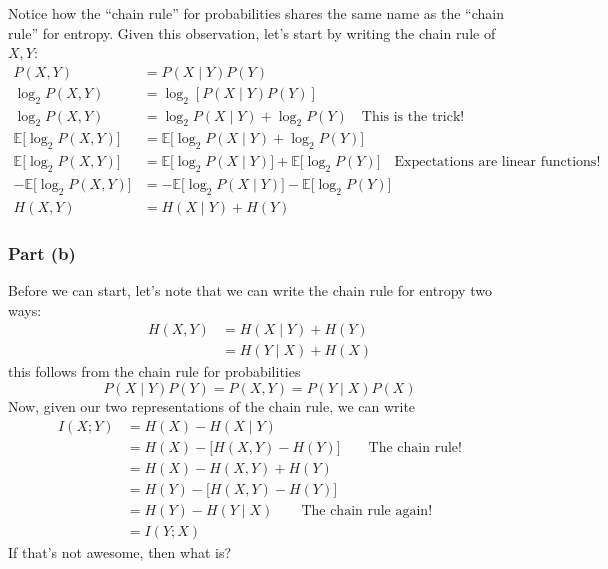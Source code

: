\documentclass[11pt]{article}
\begin{document}
Notice how the ``chain rule'' for probabilities shares the same name as the ``chain rule'' for entropy. Given this observation, let's start by writing the chain rule of $X,Y$:
\begin{align*}
    P(X,Y) &= P(X\mid Y)P(Y)\\
    \log_2 P(X,Y) &= \log_2 \left[P(X\mid Y)P(Y)\right]\\
    \log_2 P(X,Y) &= \log_2 P(X\mid Y) + \log_2 P(Y) \quad \text{This is the trick!}\\
    \mathbb{E}\big[ \log_2 P(X,Y) \big] &= \mathbb{E}\big[\log_2 P(X\mid Y) + \log_2 P(Y)\big]\\
    \mathbb{E}\big[ \log_2 P(X,Y) \big] &= \mathbb{E}\big[\log_2 P(X\mid Y)\big] + \mathbb{E}\big[\log_2 P(Y)\big] \quad \text{Expectations are linear functions!}\\
    -\mathbb{E}\big[ \log_2 P(X,Y) \big] &= -\mathbb{E}\big[\log_2 P(X\mid Y)\big] - \mathbb{E}\big[\log_2 P(Y)\big]\\
    H(X,Y) &= H(X\mid Y) + H(Y)
\end{align*}

\subsubsection*{Part (b)}

Before we can start, let's note that we can write the chain rule for entropy two ways:
\begin{align*}
    H(X,Y) &= H(X\mid Y) + H(Y)\\
    &= H(Y\mid X) + H(X)
\end{align*}
this follows from the chain rule for probabilities 
\[
P(X\mid Y)P(Y) = P(X,Y) = P(Y\mid X)P(X)
\]
Now, given our two representations of the chain rule, we can write 
\begin{align*}
    I(X;Y) &= H(X) - H(X\mid Y)\\
    &= H(X) - \big[ H(X,Y) - H(Y) \big] \qquad \text{The chain rule!}\\
    &= H(X) - H(X,Y) + H(Y)\\
    &= H(Y) - \big[ H(X,Y) - H(Y) \big]\\
    &= H(Y) - H(Y\mid X) \qquad \text{The chain rule again!}\\
    &= I(Y;X)
\end{align*}
If that's not awesome, then what is?
\end{document}
